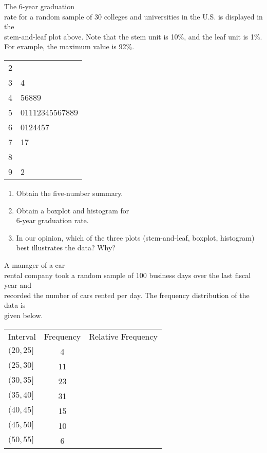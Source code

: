 \documentclass[11pt]{book}\usepackage[]{graphicx}\usepackage[]{color}
\begin{document}
\begin{exercises}
  \begin{exercise} %

The 6-year graduation \\ rate for a random sample of 30 colleges and universities
in the U.S. is displayed in the \\ stem-and-leaf plot above.  Note that the stem unit is 10\%, and the leaf unit is 1\%.  For example, the maximum value is 92\%.

\begin{table}[ht]
\centering
{\small{
\begin{tabular}{@{} r|l @{}} \hline
2 & \\
3 & 4 \\
4 & 56889 \\
5 & 01112345567889 \\
6 & 0124457 \\
7 & 17 \\
8 & \\
9 & 2 \\ \hline
\end{tabular}
}}
\end{table}

	  \begin{enumerate}
	  \item Obtain the five-number summary.
    \item Obtain a boxplot and histogram for \\ 6-year graduation rate.
    \item In our opinion, which of the three plots (stem-and-leaf, boxplot, histogram) \\ best illustrates the data? Why?
	  \end{enumerate}

	\end{exercise}



  \begin{exercise} %

A manager of a car \\ rental company took a random sample of 100 business days over the last fiscal year and \\ recorded the number of cars rented per day.  The frequency distribution of the data is \\ given below.

{\small{
\begin{tabular}{@{} lcc @{}} \hline
Interval  &  Frequency &	Relative Frequency \\
$(20, 25]$ 	&      4 \\
$(25, 30]$ 	&    11  \\
$(30, 35]$ 	&    23 \\
$(35, 40]$ 	&    31 \\
$(40, 45]$ 	&    15 \\
$(45, 50]$ 	&    10 \\
$(50, 55]$ 	&      6 \\ \hline
\end{tabular}  }}


\end{exercise}
\end{exercises}
\end{document}
